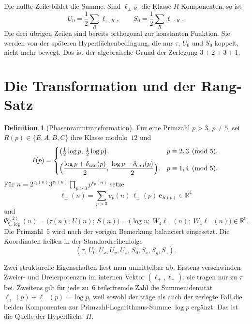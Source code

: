 \documentclass[11pt,a4paper]{article}
\theoremstyle{plain}
\theoremstyle{definition}
\newtheorem{definition}[theorem]{Definition}
\newcommand{\R}{\mathbb{R}}
\numberwithin{equation}{section}
\begin{document}
Die nullte Zeile bildet die Summe.
Sind $\ell_{\pm,R}$ die Klasse-$R$-Komponenten, so ist
\begin{equation}
U_0=\frac12\sum_R \ell_{+,R},
\qquad
S_0=\frac12\sum_R \ell_{-,R}.
\end{equation}
Die drei übrigen Zeilen sind bereits orthogonal zur konstanten Funktion.
Sie werden von der späteren Hyperflächenbedingung, die nur $\tau$, $U_0$ und
$S_0$ koppelt, nicht mehr bewegt.
Das ist der algebraische Grund der Zerlegung $3+2+3+1$.

\section{Die Transformation und der Rang-Satz}

\begin{definition}[Phasenraumtransformation]
Für eine Primzahl $p>3$, $p\neq 5$, sei $R(p)\in\{E,A,B,C\}$ ihre Klasse
modulo~$12$ und
\begin{equation}
\ell(p)=
\begin{cases}
\bigl(\tfrac12\log p,\,\tfrac12\log p\bigr),
& p\equiv 2,3\pmod{5},\\[0.7em]
\Bigl(\dfrac{\log p+\delta_{\mathrm{can}}(p)}{2},\,
\dfrac{\log p-\delta_{\mathrm{can}}(p)}{2}\Bigr),
& p\equiv 1,4\pmod{5}.
\end{cases}
\end{equation}
Für $n=2^{v_2(n)}3^{v_3(n)}\prod_{p>3}p^{v_p(n)}$ setze
\begin{equation}
\boldsymbol{\ell}_{\pm}(n)
=\sum_{p>3} v_p(n)\,\ell_{\pm}(p)\,\mathbf{e}_{R(p)}\in\R^4
\end{equation}
und
\begin{equation}
\Psi_{9,\log}^{(2)}(n)
=\bigl(\tau(n);\, U(n);\, S(n)\bigr)
=\bigl(\log n;\; W_4\boldsymbol{\ell}_+(n);\; W_4\boldsymbol{\ell}_-(n)\bigr)
\in\R^9.
\end{equation}
Die Primzahl~$5$ wird nach der vorigen Bemerkung balanciert eingesetzt.
Die Koordinaten heißen in der Standardreihenfolge
\begin{equation}
(\tau,\,U_0,U_x,U_y,U_z,\,S_0,S_x,S_y,S_z).
\end{equation}
\end{definition}

Zwei strukturelle Eigenschaften liest man unmittelbar ab.
Erstens verschwinden Zweier- und Dreierpotenzen im internen Vektor
$(\boldsymbol{\ell}_+,\boldsymbol{\ell}_-)$: sie tragen nur zu $\tau$ bei.
Zweitens gilt für jede zu~$6$ teilerfremde Zahl die Summenidentität
$\ell_+(p)+\ell_-(p)=\log p$, weil sowohl der träge als auch der zerlegte Fall
die beiden Komponenten zur Primzahl-Logarithmus-Summe $\log p$ ergänzt.
Das ist die Quelle der Hyperfläche~$H$.
\end{document}
